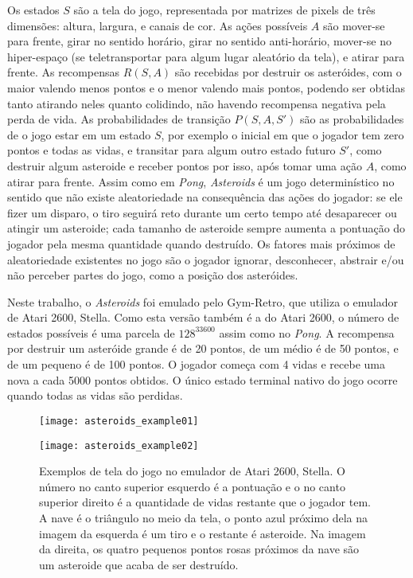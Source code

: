 Os estados $S$ são a tela do jogo, representada por matrizes de pixels de três dimensões: altura, largura, e canais de cor.
As ações possíveis $A$ são mover-se para frente, girar no sentido horário, girar no sentido anti-horário, mover-se no hiper-espaço (se teletransportar para algum lugar aleatório da tela), e atirar para frente.
As recompensas $R(S,A)$ são recebidas por destruir os asteróides, com o maior valendo menos pontos e o menor valendo mais pontos, podendo ser obtidas tanto atirando neles quanto colidindo, não havendo recompensa negativa pela perda de vida.
As probabilidades de transição $P(S,A,S')$ são as probabilidades de o jogo estar em um estado $S$, por exemplo o inicial em que o jogador tem zero pontos e todas as vidas, e transitar para algum outro estado futuro $S'$, como destruir algum asteroide e receber pontos por isso, após tomar uma ação $A$, como atirar para frente.
Assim como em \textit{Pong}, \textit{Asteroids} é um jogo determinístico no sentido que não existe aleatoriedade na consequência das ações do jogador: se ele fizer um disparo, o tiro seguirá reto durante um certo tempo até desaparecer ou atingir um asteroide; cada tamanho de asteroide sempre aumenta a pontuação do jogador pela mesma quantidade quando destruído.
Os fatores mais próximos de aleatoriedade existentes no jogo são o jogador ignorar, desconhecer, abstrair e/ou não perceber partes do jogo, como a posição dos asteróides.

Neste trabalho, o \textit{Asteroids} foi emulado pelo Gym-Retro, que utiliza o emulador de Atari 2600, Stella.
Como esta versão também é a do Atari 2600, o número de estados possíveis é uma parcela de $128^{33600}$ assim como no \textit{Pong}.
A recompensa por destruir um asteróide grande é de 20 pontos, de um médio é de 50 pontos, e de um pequeno é de 100 pontos.
O jogador começa com 4 vidas e recebe uma nova a cada 5000 pontos obtidos.
O único estado terminal nativo do jogo ocorre quando todas as vidas são perdidas.

\begin{figure}[h!]
  \begin{minipage}[b]{.5\textwidth}
  \centering
  \texttt{[image: asteroids\_example01]}
  \end{minipage}
  \hfill
  \begin{minipage}[b]{.5\textwidth}
  \texttt{[image: asteroids\_example02]}
  \end{minipage}
  \caption{Exemplos de tela do jogo no emulador de Atari 2600, Stella. O número no canto superior esquerdo é a pontuação e o no canto superior direito é a quantidade de vidas restante que o jogador tem. A nave é o triângulo no meio da tela, o ponto azul próximo dela na imagem da esquerda é um tiro e o restante é asteroide. Na imagem da direita, os quatro pequenos pontos rosas próximos da nave são um asteroide que acaba de ser destruído.}
\end{figure}


